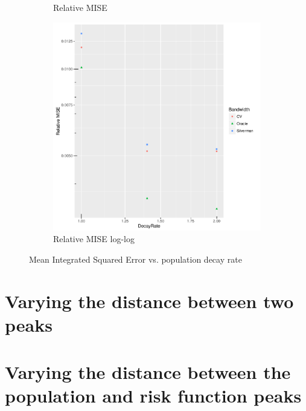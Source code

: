 \begin{figure}[htb]
\begin{subfigure}[b]{0.3\textwidth}
    \caption{Relative MISE}
    \end{subfigure}
    \begin{subfigure}[b]{0.3\textwidth}
    \includegraphics[width=\textwidth]{results/by_population_decay/RMISE-vs-population-decay-log-log}
    \caption{Relative MISE log-log}
    \end{subfigure}
    \caption[MISE: by risk decay]{Mean Integrated Squared Error vs. population decay rate}
    \label{fig:ise:pSD_100_1h}
\end{figure}


\section{Varying the distance between two peaks}


\section{Varying the distance between the population and risk function peaks}


